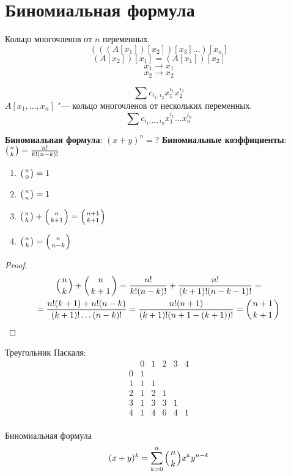 ﻿\section{Биномиальная формула}
\begin{Def}
Кольцо многочленов от $n$ переменных.
$$(((A[x_1])[x_2])[x_3] \ldots )[x_n]$$
$$(A[x_2])[x_1] = (A[x_1])[x_2]$$
$$x_1 \to x_1$$
$$x_2 \to x_2$$

$$\sum c_{i_1, i_2}x_{1}^{i_1}x_2^{i_2}$$
$A[x_1, \ldots, x_n]$ "--- кольцо многочленов от нескольких переменных.
$$\sum c_{i_1, \ldots, i_n}x_1^{i_1}\ldots x_n^{i_n} $$
\end{Def}

\textbf{Биномиальная формула}: $(x + y)^n = ?$
\textbf{Биномиальные коэффициенты}: ${\left(n \atop k\right)} = \frac{n!}{k!(n - k)!}$

\begin{lemma} 
\begin{enumerate}
\item ${\left(n \atop 0\right)} = 1$
\item ${\left(n \atop n\right)} = 1$
\item ${\left(n \atop k\right)} + {\left(n \atop k + 1\right)} = {\left(n + 1 \atop k + 1\right)}$
\item ${\left(n \atop k\right)} = {\left(n \atop n - k\right)}$
\end{enumerate}
\end{lemma}
\begin{proof}
\begin{gather*}
{\left(n \atop k\right)} + {\left(n \atop k + 1\right)} = \frac{n!}{k!(n - k)!} + \frac{n!}{(k + 1)!(n - k - 1)!} = \\
= \frac{n!(k + 1) + n!(n - k)}{(k + 1)! \ldots (n - k)!} = \frac{n!(n + 1)}{(k + 1)!(n + 1 - (k + 1))!} = {\left(n + 1 \atop k + 1\right)}
\end{gather*}
\end{proof}

\begin{Def}
Треугольник Паскаля:
\[ \begin{array}{c|ccccc}
& 0 & 1 & 2 & 3 & 4 \\
\hline
0 & 1 &   &   &   &   \\
1 & 1 & 1 &   &   &   \\
2 & 1 & 2 & 1 &   &   \\
3 & 1 & 3 & 3 & 1 &   \\
4 & 1 & 4 & 6 & 4 & 1 \\
\end{array} \]
\end{Def}

\begin{theorem}{Биномиальная формула}
\[ (x + y)^k = \sum_{k = 0}^n {\left(n \atop k\right)} x^ky^{n - k} \]
\end{theorem}

